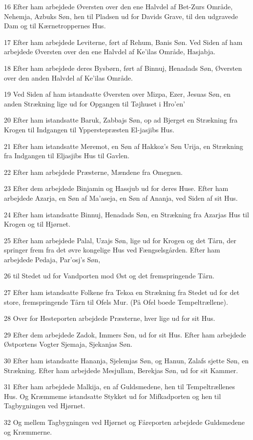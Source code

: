 \par 16 Efter ham arbejdede Øversten over den ene Halvdel af Bet-Zurs Område, Nehemja, Azbuks Søn, hen til Pladsen ud for Davids Grave, til den udgravede Dam og til Kærnetroppernes Hus.
\par 17 Efter ham arbejdede Leviterne, ført af Rehum, Banis Søn. Ved Siden af ham arbejdede Øversten over den ene Halvdel af Ke'ilas Område, Hasjabja.
\par 18 Efter ham arbejdede deres Bysbørn, ført af Binnuj, Henadads Søn, Øversten over den anden Halvdel af Ke'ilas Område.
\par 19 Ved Siden af ham istandsatte Øversten over Mizpa, Ezer, Jesuas Søn, en anden Strækning lige ud for Opgangen til Tøjhuset i Hro'en'
\par 20 Efter ham istandsatte Baruk, Zabbajs Søn, op ad Bjerget en Strækning fra Krogen til Indgangen til Ypperstepræsten El-jasjibs Hus.
\par 21 Efter ham istandsatte Meremot, en Søn af Hakkoz's Søn Urija, en Strækning fra Indgangen til Eljasjibs Hus til Gavlen.
\par 22 Efter ham arbejdede Præsterne, Mændene fra Omegnen.
\par 23 Efter dem arbejdede Binjamin og Hassjub ud for deres Huse. Efter ham arbejdede Azarja, en Søn af Ma'aseja, en Søn af Ananja, ved Siden af sit Hus.
\par 24 Efter ham istandsatte Binnuj, Henadads Søn, en Strækning fra Azarjas Hus til Krogen og til Hjørnet.
\par 25 Efter ham arbejdede Palal, Uzajs Søn, lige ud for Krogen og det Tårn, der springer frem fra det øvre kongelige Hus ved Fængselsgården. Efter ham arbejdede Pedaja, Par'osj's Søn,
\par 26 til Stedet ud for Vandporten mod Øst og det fremspringende Tårn.
\par 27 Efter ham istandsatte Folkene fra Tekoa en Strækning fra Stedet ud for det store, fremspringende Tårn til Ofels Mur. (På Ofel boede Tempeltrællene).
\par 28 Over for Hesteporten arbejdede Præsterne, hver lige ud for sit Hus.
\par 29 Efter dem arbejdede Zadok, Immers Søn, ud for sit Hus. Efter ham arbejdede Østportens Vogter Sjemaja, Sjekanjas Søn.
\par 30 Efter ham istandsatte Hananja, Sjelemjas Søn, og Hanun, Zalafs sjette Søn, en Strækning. Efter ham arbejdede Mesjullam, Berekjas Søn, ud for sit Kammer.
\par 31 Efter ham arbejdede Malkija, en af Guldsmedene, hen til Tempeltrællenes Hus. Og Kræmmeme istandsatte Stykket ud for Mifkadporten og hen til Tagbygningen ved Hjørnet.
\par 32 Og mellem Tagbygningen ved Hjørnet og Fåreporten arbejdede Guldsmedene og Kræmmerne.

